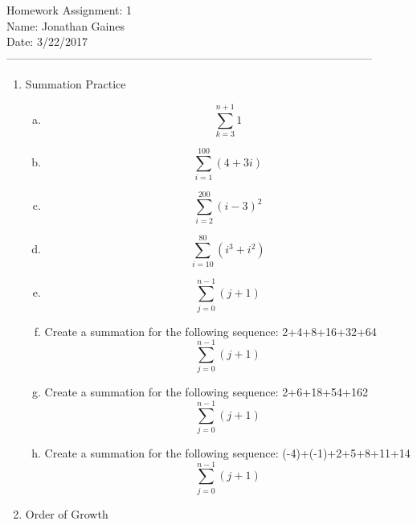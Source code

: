 \documentclass[12pt]{article}
\begin{document}
Homework Assignment: 1\\ 
Name: Jonathan Gaines\\ 
Date: 3/22/2017\\ --------------------------------------------------------------------------------------------------
\begin {enumerate}
\item Summation Practice
				\begin {enumerate}[(a)]
					\item $$\sum_{k=3}^{n+1} 1$$   						%
					\item $$\sum_{i=1}^{100} (4+3i)$$  				%
					\item $$\sum_{i=2}^{200} (i-3)^{2}$$   		%
					\item $$\sum_{i=10}^{80} (i^{3} + i^{2})$$%
					\item $$\sum_{j=0}^{n-1} (j+1)$$						%
					\item Create a summation for the following sequence: 2+4+8+16+32+64 %
								$$\sum_{j=0}^{n-1} (j+1)$$	
					\item Create a summation for the following sequence: 2+6+18+54+162 %
								$$\sum_{j=0}^{n-1} (j+1)$$		
				\item Create a summation for the following sequence: (-4)+(-1)+2+5+8+11+14%
								$$\sum_{j=0}^{n-1} (j+1)$$	
				\end {enumerate}
\item Order of Growth 
\end {enumerate}
\end{document}
